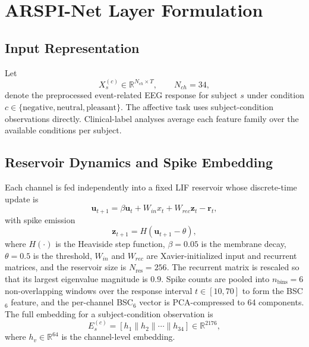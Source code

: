 \documentclass[journal]{IEEEtran}
\begin{document}
\section{ARSPI-Net Layer Formulation}
\subsection{Input Representation}
Let
\begin{equation}
X_s^{(c)} \in \mathbb{R}^{N_{ch}\times T}, \qquad N_{ch}=34,
\end{equation}
denote the preprocessed event-related EEG response for subject $s$ under condition $c\in\{\mathrm{negative},\mathrm{neutral},\mathrm{pleasant}\}$. The affective task uses subject-condition observations directly. Clinical-label analyses average each feature family over the available conditions per subject.

\subsection{Reservoir Dynamics and Spike Embedding}
Each channel is fed independently into a fixed LIF reservoir whose discrete-time update is
\begin{equation}
\mathbf{u}_{t+1}=\beta\mathbf{u}_{t}+W_{in}x_t+W_{rec}\mathbf{z}_t-\mathbf{r}_t,
\label{eq:lif}
\end{equation}
with spike emission
\begin{equation}
\mathbf{z}_{t+1}=H(\mathbf{u}_{t+1}-\theta),
\label{eq:spike}
\end{equation}
where $H(\cdot)$ is the Heaviside step function, $\beta=0.05$ is the membrane decay, $\theta=0.5$ is the threshold, $W_{in}$ and $W_{rec}$ are Xavier-initialized input and recurrent matrices, and the reservoir size is $N_{\text{res}}=256$. The recurrent matrix is rescaled so that its largest eigenvalue magnitude is $0.9$. Spike counts are pooled into $n_{\text{bins}}=6$ non-overlapping windows over the response interval $t\in[10,70]$ to form the BSC$_6$ feature, and the per-channel BSC$_6$ vector is PCA-compressed to 64 components. The full embedding for a subject-condition observation is
\begin{equation}
E_s^{(c)}=\left[h_1\|h_2\|\cdots\|h_{34}\right]\in\mathbb{R}^{2176},
\label{eq:E}
\end{equation}
where $h_v\in\mathbb{R}^{64}$ is the channel-level embedding.
\end{document}
